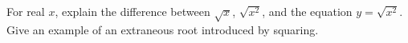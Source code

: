 For real $ x $, explain the difference between $\sqrt{x}$, $\sqrt{x^2}$, and the equation $ y=\sqrt{x^2}$. Give an example of an extraneous root introduced by squaring.
